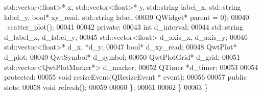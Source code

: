 \begin{DoxyCode}
      std::vector<float>* x, std::vector<float>* y, std::string label\_x, std::string label\_y, \textcolor{keywordtype}{bool}* xy\_read, 
      std::string label,
00039             QWidget* parent = 0);
00040             ~scatter_plot();
00041             
00042         \textcolor{keyword}{private}:
00043             \textcolor{keywordtype}{int} d_interval;
00044             std::string d_label_x, d_label_y;
00045             std::vector<float> d_axis_x, d_axis_y;
00046             std::vector<float>* d_x, *d_y;
00047             \textcolor{keywordtype}{bool}* d_xy_read;
00048             QwtPlot* d_plot;
00049             QwtSymbol* d_symbol;
00050             QwtPlotGrid* d_grid;
00051             std::vector<QwtPlotMarker*> d_marker;
00052             QTimer *d_timer;
00053             
00054         \textcolor{keyword}{protected}:
00055             \textcolor{keywordtype}{void} resizeEvent(QResizeEvent * event);
00056             
00057         \textcolor{keyword}{public} slots:
00058             \textcolor{keywordtype}{void} refresh();
00059             
00060         \};
00061 
00062     \}
00063 \}
\end{DoxyCode}
